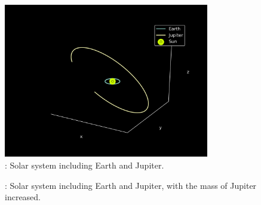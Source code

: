 \documentclass{article}
\begin{document}
        \begin{figure}[H]
            \begin{center}
                \includegraphics[width=0.8\textwidth]{./Plot/Earth_Jupiter1.png}
                \caption{: Solar system including Earth and Jupiter.}
                \label{fig:jupiter1}
            \end{center}
        \end{figure}

        \begin{figure}[H]
            \caption{: Solar system including Earth and Jupiter, with the mass of Jupiter increased.}
            \label{fig:jupiter}
            \end{figure}
\end{document}
